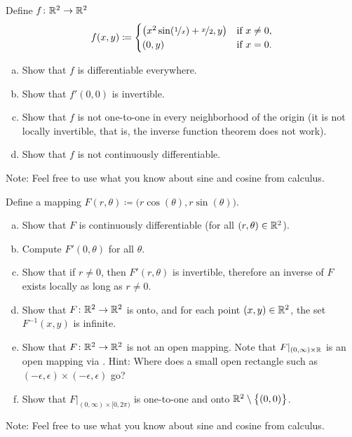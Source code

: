 \begin{samepage}
\begin{exercise}
Define $f \colon {\mathbb{R}}^2 \to {\mathbb{R}}^2$
\begin{equation*}
f(x,y) \coloneqq
\begin{cases}
\bigl(x^2 \sin (\nicefrac{1}{x}) + \nicefrac{x}{2} , y \bigr) &
 \text{if } x \not= 0, \\
(0,y) &
 \text{if } x=0.
\end{cases}
\end{equation*}
\begin{enumerate}[a)]
\item
Show that $f$ is differentiable everywhere.
\item
Show that $f'(0,0)$ is invertible.
\item
Show that $f$ is not one-to-one in every neighborhood of the origin (it is
not locally invertible, that is, the inverse function theorem does not work).
\item
Show that $f$ is not continuously differentiable.
\end{enumerate}
Note: Feel free to use what you know about sine and cosine from calculus.
\end{exercise}
\end{samepage}

\begin{exercise} \label{mv:exercise:polarcoordinates}
Define a mapping $F(r,\theta) \coloneqq \bigl(r \cos(\theta), r \sin(\theta) \bigr)$.
\begin{enumerate}[a)]
\item
Show that $F$ is continuously differentiable (for all $(r,\theta) \in
{\mathbb{R}}^2$).
\item
Compute $F'(0,\theta)$ for all $\theta$.
\item
Show that if $r \not= 0$, then $F'(r,\theta)$ is invertible, therefore an
inverse of $F$ exists locally as long as $r \not= 0$.
\item
Show that $F \colon {\mathbb{R}}^2 \to {\mathbb{R}}^2$ is onto, and for each point $(x,y) \in
{\mathbb{R}}^2$, the set $F^{-1}(x,y)$ is infinite.
\item
Show that $F \colon {\mathbb{R}}^2 \to {\mathbb{R}}^2$ is not an open mapping.
Note that $F|_{(0,\infty) \times {\mathbb{R}}}$ is an open mapping
via .
Hint: Where does a
small open rectangle such as $(-\epsilon,\epsilon) \times
(-\epsilon,\epsilon)$ go?
\item
Show that $F|_{(0,\infty) \times [0,2\pi)}$ is one-to-one and onto
${\mathbb{R}}^2 \setminus \bigl\{ (0,0) \bigr\}$.
\end{enumerate}
Note: Feel free to use what you know about sine and cosine from calculus.
\end{exercise}

